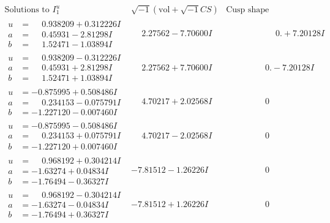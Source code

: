 \documentclass[1p]{elsarticle_modified}
\theoremstyle{definition}
\newcommand{\I}{\sqrt{-1}}
\begin{document}
$$\begin{array}{c|c|c}  
\text{Solutions to }I^u_{1}& \I (\text{vol} + \sqrt{-1}CS) & \text{Cusp shape}\\
 \hline 
\begin{aligned}
u &= \phantom{-}0.938209 + 0.312226 I \\
a &= \phantom{-}0.45931 - 2.81298 I \\
b &= \phantom{-}1.52471 - 1.03894 I\end{aligned}
 & \phantom{-}2.27562 - 7.70600 I & \phantom{-0.000000 -}0. + 7.20128 I \\ \hline\begin{aligned}
u &= \phantom{-}0.938209 - 0.312226 I \\
a &= \phantom{-}0.45931 + 2.81298 I \\
b &= \phantom{-}1.52471 + 1.03894 I\end{aligned}
 & \phantom{-}2.27562 + 7.70600 I & \phantom{-0.000000 } 0. - 7.20128 I \\ \hline\begin{aligned}
u &= -0.875995 + 0.508486 I \\
a &= \phantom{-}0.234153 - 0.075791 I \\
b &= -1.227120 - 0.007460 I\end{aligned}
 & \phantom{-}4.70217 + 2.02568 I & \phantom{-0.000000 } 0 \\ \hline\begin{aligned}
u &= -0.875995 - 0.508486 I \\
a &= \phantom{-}0.234153 + 0.075791 I \\
b &= -1.227120 + 0.007460 I\end{aligned}
 & \phantom{-}4.70217 - 2.02568 I & \phantom{-0.000000 } 0 \\ \hline\begin{aligned}
u &= \phantom{-}0.968192 + 0.304214 I \\
a &= -1.63274 + 0.04834 I \\
b &= -1.76494 - 0.36327 I\end{aligned}
 & -7.81512 - 1.26226 I & \phantom{-0.000000 } 0 \\ \hline\begin{aligned}
u &= \phantom{-}0.968192 - 0.304214 I \\
a &= -1.63274 - 0.04834 I \\
b &= -1.76494 + 0.36327 I\end{aligned}
 & -7.81512 + 1.26226 I & \phantom{-0.000000 } 0 \\ \hline\begin{aligned}

\end{aligned}
\end{array}$$
\end{document}
